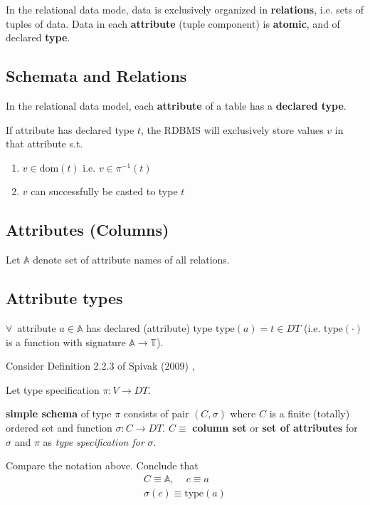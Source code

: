 In the relational data mode, data is exclusively organized in \textbf{relations}, i.e. sets of tuples of data. Data in each \textbf{attribute} (tuple component) is \textbf{atomic}, and of declared \textbf{type}.

\subsection{Schemata and Relations}

In the relational data model, each \textbf{attribute} of a table has a \textbf{declared type}.

If attribute has declared type $t$, the RDBMS will exclusively store values $v$ in that attribute s.t. 
\begin{enumerate}
	\item $v \in \text{dom}(t)$ i.e. $v \in \pi^{-1}(t)$
	\item $v$ can successfully be casted to type $t$
\end{enumerate}

\subsection{Attributes (Columns)}

Let $\mathbb{A}$ denote set of attribute names of all relations.

\subsection{Attribute types}
$\forall \, $ attribute $a\in \mathbb{A}$ has declared (attribute) type $\text{type}(a) = t\in DT$ (i.e. $\text{type}(\cdot)$ is a function with signature $\mathbb{A} \to \mathbb{T}$).

Consider Definition 2.2.3 of Spivak (2009) \cite{agat:Spiv2009}, 

\begin{definition}
	Let type specification $\pi :V \to DT$. 
	
	\textbf{simple schema} of type $\pi$ consists of pair $(C, \sigma)$ where $C$ is a finite (totally) ordered set and function $\sigma : C \to DT$.  $C \equiv $ \textbf{column set} or \textbf{set of attributes} for $\sigma$ and $\pi$ as \emph{type specification for} $\sigma$.
\end{definition}

Compare the notation above. Conclude that
\[
\begin{gathered}
C \equiv \mathbb{A}, \quad \, c \equiv a \\
\sigma(c) \equiv \text{type}(a)
\end{gathered}
\]

